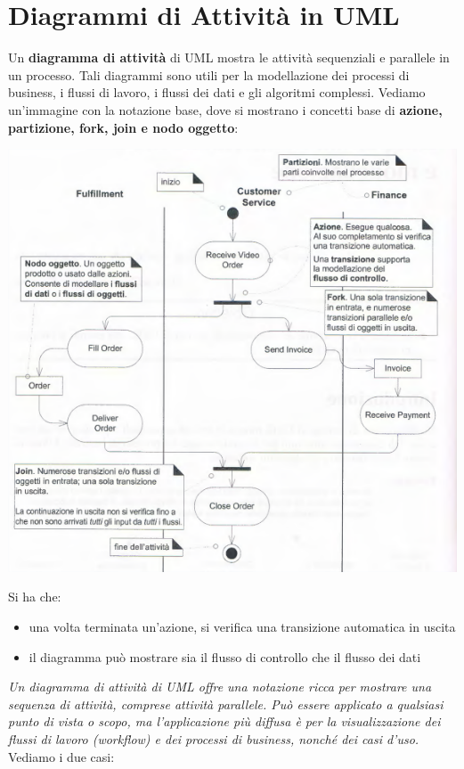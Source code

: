 \documentclass[a4paper,12pt, oneside]{book}
\begin{document}
\chapter{Diagrammi di Attività in UML}
Un \textbf{diagramma di attività} di UML mostra le attività sequenziali e parallele in un processo. Tali diagrammi sono utili per la modellazione dei processi di business, i flussi di lavoro, i flussi dei dati e gli algoritmi complessi. Vediamo un'immagine con la notazione base, dove si mostrano i concetti base di \textbf{azione, partizione, fork, join e nodo oggetto}:
\begin{center}
	\includegraphics[scale=0.58]{img/atd.png}
\end{center}
Si ha che:
\begin{itemize}
	\item una volta terminata un'azione, si verifica una transizione automatica in uscita
	\item il diagramma può mostrare sia il flusso di controllo che il flusso dei dati 
\end{itemize}
\textit{Un diagramma di attività di UML offre una notazione ricca per mostrare una sequenza di attività, comprese attività parallele. Può essere applicato a qualsiasi punto di vista o scopo, ma l'applicazione più diffusa è per la visualizzazione dei flussi di lavoro (workflow) e dei processi di business, nonché dei casi d'uso.}
\newpage
Vediamo i due casi:
\end{document}
